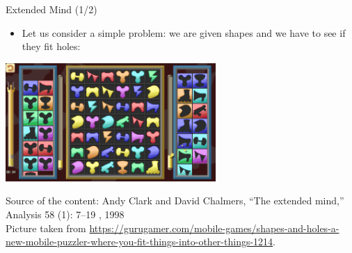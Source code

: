 \documentclass{beamer}
\begin{document}
\begin{frame}
{\centerline{Extended Mind (1/2)}}

\begin{itemize}
    \item Let us consider a simple problem: we are given shapes and we have to see if they fit holes:
\end{itemize} 

\begin{center}
 \includegraphics[width=8cm]{P2023.AIBCCSS.ExtendedMindDistributedCognitionSystemicThinking/campaignlevel-3-f53c.png}
 
 \end{center}

\begin{center}
    \tiny{Source of the content: Andy Clark and David Chalmers, ``The extended mind,'' Analysis 58 (1): 7--19 , 1998 \\Picture taken from \url{https://gurugamer.com/mobile-games/shapes-and-holes-a-new-mobile-puzzler-where-you-fit-things-into-other-things-1214}.}
\end{center}
\end{frame}
\end{document}

